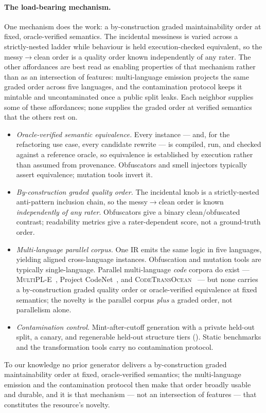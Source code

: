 \paragraph{The load-bearing mechanism.} One mechanism does the work: a by-construction
graded maintainability order at fixed, oracle-verified semantics. The incidental messiness
is varied across a strictly-nested ladder while behaviour is held execution-checked
equivalent, so the messy$\rightarrow$clean order is a quality order known independently of
any rater. The other affordances are best read as enabling properties of that mechanism
rather than as an intersection of features: multi-language emission projects the same
graded order across five languages, and the contamination protocol keeps it mintable and
uncontaminated once a public split leaks. Each neighbor supplies some of these affordances;
none supplies the graded order at verified semantics that the others rest on.
\begin{itemize}
  \item \emph{Oracle-verified semantic equivalence.} Every instance --- and, for the
        refactoring use case, every candidate rewrite --- is compiled, run, and checked
        against a reference oracle, so equivalence is established by execution rather than
        assumed from provenance. Obfuscators and smell injectors typically assert
        equivalence; mutation tools invert it.
  \item \emph{By-construction graded quality order.} The incidental knob is a
        strictly-nested anti-pattern inclusion chain, so the messy$\rightarrow$clean order
        is known \emph{independently of any rater}. Obfuscators give a binary
        clean/obfuscated contrast; readability metrics give a rater-dependent score, not a
        ground-truth order.
  \item \emph{Multi-language parallel corpus.} One IR emits the same logic in five
        languages, yielding aligned cross-language instances. Obfuscation and mutation
        tools are typically single-language. Parallel multi-language \emph{code} corpora
        do exist --- \textsc{MultiPL-E}~\citep{cassano2023multipl}, Project
        CodeNet~\citep{puri2021codenet}, and \textsc{CodeTransOcean}~\citep{yan2023codetransocean}
        --- but none carries a by-construction graded quality order or oracle-verified
        equivalence at fixed semantics; the novelty is the parallel corpus \emph{plus} a
        graded order, not parallelism alone.
  \item \emph{Contamination control.} Mint-after-cutoff generation with a private
        held-out split, a canary, and regenerable held-out structure tiers (). Static
        benchmarks and the transformation tools carry no contamination protocol.
\end{itemize}
\noindent To our knowledge no prior generator delivers a by-construction graded
maintainability order at fixed, oracle-verified semantics; the multi-language emission and
the contamination protocol then make that order broadly usable and durable, and it is that
mechanism --- not an intersection of features --- that constitutes the resource's novelty.
